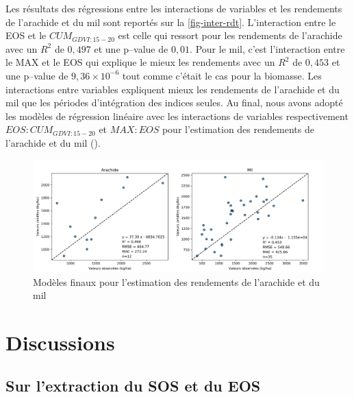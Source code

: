 \vspace{5mm}

Les résultats des régressions entre les interactions de variables et les rendements
de l’arachide et du mil sont reportés sur la \cref{fig-inter-rdt}. L’interaction entre le EOS et le $CUM_{GDVI:15-20}$ est celle qui ressort pour les rendements de l’arachide avec un $R^{2}$ de $0,497$ et une p--value de $0,01$. Pour le mil, c’est l’interaction entre le MAX et le EOS qui explique le mieux les rendements avec un $R^{2}$ de $0,453$ et une p--value de $9,36\times10^{-6}$ tout comme c’était le cas pour la biomasse. Les interactions entre variables expliquent mieux les rendements de l’arachide et du mil que les périodes d’intégration des indices seules. Au final, nous avons adopté les modèles de régression linéaire avec les interactions de variables respectivement $EOS : CUM_{GDVI:15-20}$ et $MAX : EOS$ pour l’estimation des rendements de l’arachide et du mil ().

\begin{figure}[htbp]
 \begin{center}
  \includegraphics[scale=0.6]{resultats_discussions/Model_Rdt.png} 
 \end{center}
 \caption[Modèles finaux pour l’estimation des rendements]{Modèles finaux pour l’estimation des rendements de l’arachide et du mil}
 \label{fig-model-rdt}
\end{figure}
  
\section{Discussions}

\subsection{Sur l'extraction du SOS et du EOS}

